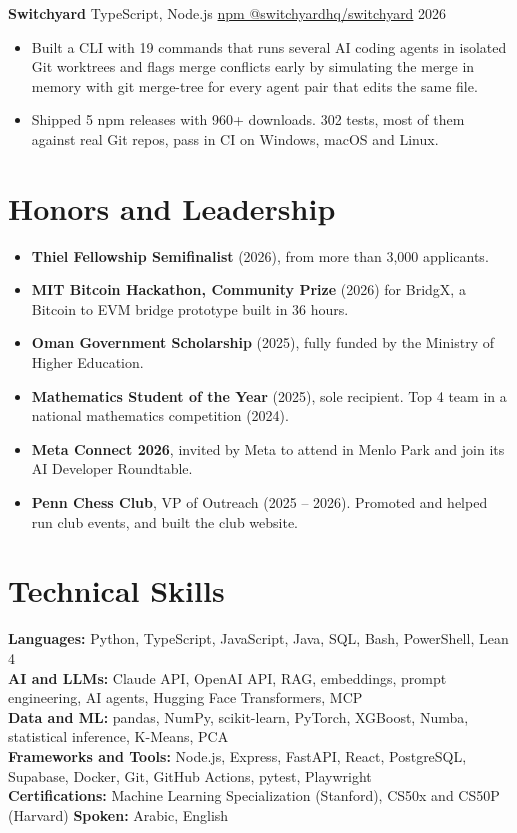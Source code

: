\documentclass[10pt,letterpaper]{article}
\newcommand{\entry}[2]{%
  \par\noindent #1 \hfill {\color{soft}\small #2}\par
  \vspace{0.12em}
}
\begin{document}
\vspace{0.25em}
\entry{\textbf{Switchyard} \textbar{} TypeScript, Node.js \textbar{} \href{https://www.npmjs.com/package/@switchyardhq/switchyard}{npm @switchyardhq/switchyard}}{2026}
\begin{itemize}
  \item Built a CLI with 19 commands that runs several AI coding agents in isolated Git worktrees and flags merge
        conflicts early by simulating the merge in memory with git merge-tree for every agent pair that edits the same file.
  \item Shipped 5 npm releases with 960+ downloads. 302 tests, most of them against real Git repos, pass in CI on Windows,
        macOS and Linux.
\end{itemize}

\section{Honors and Leadership}
\begin{itemize}
  \item \textbf{Thiel Fellowship Semifinalist} (2026), from more than 3,000 applicants.
  \item \textbf{MIT Bitcoin Hackathon, Community Prize} (2026) for BridgX, a Bitcoin to EVM bridge prototype built in 36 hours.
  \item \textbf{Oman Government Scholarship} (2025), fully funded by the Ministry of Higher Education.
  \item \textbf{Mathematics Student of the Year} (2025), sole recipient. Top 4 team in a national mathematics competition (2024).
  \item \textbf{Meta Connect 2026}, invited by Meta to attend in Menlo Park and join its AI Developer Roundtable.
  \item \textbf{Penn Chess Club}, VP of Outreach (2025 -- 2026). Promoted and helped run club events, and built the club website.
\end{itemize}

\section{Technical Skills}

\textbf{Languages:} Python, TypeScript, JavaScript, Java, SQL, Bash, PowerShell, Lean 4\\
\textbf{AI and LLMs:} Claude API, OpenAI API, RAG, embeddings, prompt engineering, AI agents, Hugging Face Transformers, MCP\\
\textbf{Data and ML:} pandas, NumPy, scikit-learn, PyTorch, XGBoost, Numba, statistical inference, K-Means, PCA\\
\textbf{Frameworks and Tools:} Node.js, Express, FastAPI, React, PostgreSQL, Supabase, Docker, Git, GitHub Actions, pytest, Playwright\\
\textbf{Certifications:} Machine Learning Specialization (Stanford), CS50x and CS50P (Harvard) \textbar{} \textbf{Spoken:} Arabic, English
\end{document}
